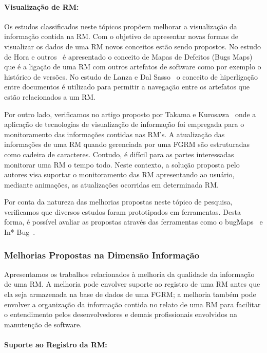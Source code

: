 \paragraph{Visualização de RM:} Os estudos classificados neste tópicos propõem
melhorar a visualização da informação contida na RM\@. Com o objetivo de
apresentar novas formas de visualizar os dados de uma RM novos conceitos estão
sendo propostos. No estudo de Hora e outros~\cite{hora2012bug} é apresentado o
conceito de Mapas de Defeitos (Bugs Maps) que é a ligação de uma RM com outros
artefatos de software como por exemplo o histórico de versões.  No estudo de
Lanza e  Dal Sasso~\cite{dal2014bug} o conceito de hiperligação entre documentos
é utilizado para permitir a navegação entre os artefatos que estão relacionados
a um RM\@.

Por outro lado, verificamos no artigo proposto por Takama e
Kurosawa~\cite{takama2013application} onde a aplicação de tecnologias de
visualização de informação foi empregada para o monitoramento das informações
contidas nas RM's. A atualização das informações de uma RM quando gerenciada por
uma FGRM são estruturadas como cadeira de caracteres. Contudo, é difícil para as
partes interessadas monitorar uma RM o tempo todo. Neste contexto, a solução
proposta pelo autores visa suportar o monitoramento das RM apresentando ao
usuário, mediante animações, as atualizações ocorridas em determinada RM\@.

Por conta da natureza das melhorias propostas neste tópico de pesquisa,
verificamos que diversos estudos foram prototipados em ferramentas. Desta forma,
é possível avaliar as propostas através das ferramentas como o
bugMaps~\cite{hora2012bug} e In* Bug~\cite{dal2014bug}.

\subsubsection{Melhorias Propostas na Dimensão Informação}
\label{ssub:melhorias_dim_informacao}

Apresentamos os trabalhos relacionados à melhoria da qualidade da informação de
uma RM. A melhoria pode envolver suporte ao registro de uma RM antes que ela
seja armazenada na base de dados de uma FGRM\@; a melhoria também pode envolver
a organização da informação contida no relato de uma RM para facilitar o
entendimento pelos desenvolvedores e demais profissionais envolvidos na
manutenção de software.

\paragraph{Suporte ao Registro da RM:}

